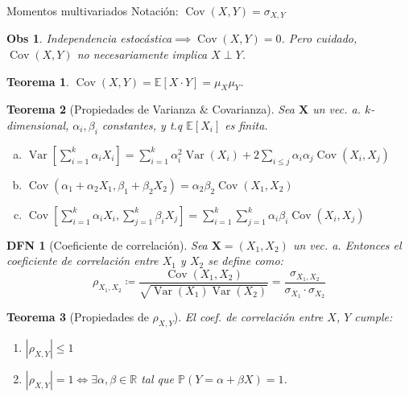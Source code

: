 \documentclass[a4paper]{article}
\newtheorem{definition}{DFN}
\theoremstyle{mytheoremstyle}
\newtheorem{theorem}{Teorema}
\newtheorem*{obs}{Obs}
\newcommand{\IP}{\mathbb{P}}
\newcommand{\R}{\mathbb{R}}
\newcommand{\E}{\mathbb{E}}
\newcommand{\1}{\mathds{1}}
\providecommand{\abs}[1]{\left|#1\right|}
\DeclareMathOperator{\Var}{Var}
\DeclareMathOperator{\cov}{Cov}
\renewcommand{\vec}[1]{\boldsymbol{#1}}
\begin{document}
\begin{multicols*}{3}
\begin{roundbox}{Momentos multivariados}
Notación: $\cov(X,Y) = \sigma_{X,Y}$

\begin{obs}
    Independencia estocástica$\implies \cov(X,Y) = 0$.
    Pero cuidado, $\cov(X,Y)$ no necesariamente implica $X\perp Y$.
\end{obs}

\begin{theorem}
    $\cov(X,Y) = \E[X \cdot Y] = \mu_X \mu_Y$.
\end{theorem}

\begin{theorem}[Propiedades de Varianza \& Covarianza]
    Sea $\vec{X}$ un vec. a. $k$-dimensional, $\alpha_i, \beta_i$ constantes, y t.q $\E[X_i]$ es finita.
    \begin{enumerate}[a)]
        \item $\displaystyle \Var\left[\sum_{i=1}^{k} \alpha_i X_i \right] = \sum_{i=1}^{k} \alpha_i^{2} \Var(X_i) + 2 \sum_{i\leq j} \alpha_i \alpha_j \cov(X_i, X_j)$
        \item $\cov(\alpha_1 + \alpha_2 X_1, \beta_1 + \beta_2 X_2) = \alpha_2 \beta_2 \cov(X_1, X_2)$
        \item $\displaystyle \cov\left[ \sum_{i=1}^{k} \alpha_i X_i, \sum_{j=1}^{k} \beta_i X_j \right] = \sum_{i=1}^{k} \sum_{j=1}^{k} \alpha_i \beta_i \cov(X_i, X_j)$
    \end{enumerate}
\end{theorem}

\begin{definition}[Coeficiente de correlación]
    Sea $\vec{X} = (X_1, X_2)$ un vec. a.
    Entonces el coeficiente de correlación entre $X_1$ y $X_2$ se define como: 
    \begin{equation*}
        \rho_{X_1, X_2} \coloneqq \frac{\cov(X_1, X_2)}{\sqrt{\Var(X_1) \Var(X_2)}} = \frac{\sigma_{X_1, X_2}}{\sigma_{X_1} \cdot \sigma_{X_2}}
    \end{equation*}
\end{definition}

\begin{theorem}[Propiedades de $\rho_{X,Y}$]
    El coef. de correlación entre $X$, $Y$ cumple:
    \begin{enumerate}
        \item $\abs{\rho_{X,Y}} \leq 1$
        \item $\abs{\rho_{X,Y}} = 1 \iff \exists \alpha, \beta \in \R$ tal que $\IP(Y=\alpha + \beta X) = 1$.
    \end{enumerate}
\end{theorem}


\end{roundbox}
\end{multicols*}
\end{document}
